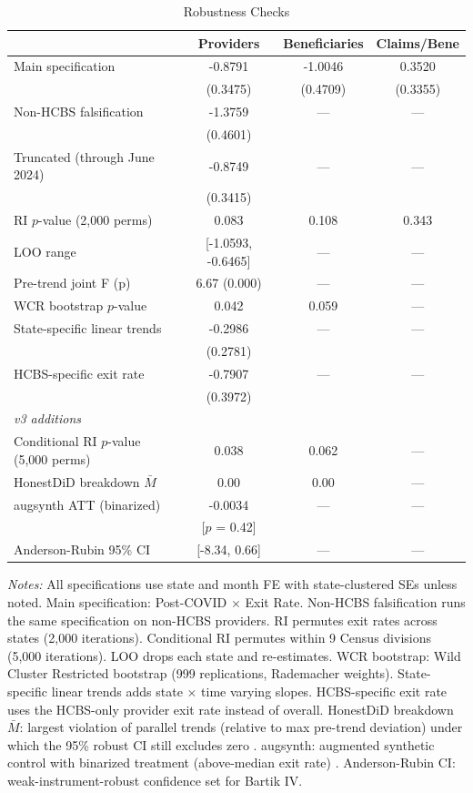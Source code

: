 \begin{table}[t]
\centering
\caption{Robustness Checks}
\label{tab:robustness}
\begin{tabular}{lccc}
\toprule
 & Providers & Beneficiaries & Claims/Bene \\
\midrule
Main specification & -0.8791 & -1.0046 & 0.3520 \\
 & (0.3475) & (0.4709) & (0.3355) \\
Non-HCBS falsification & -1.3759 & --- & --- \\
 & (0.4601) & & \\
Truncated (through June 2024) & -0.8749 & --- & --- \\
 & (0.3415) & & \\
\midrule
RI $p$-value (2,000 perms) & 0.083 & 0.108 & 0.343 \\
LOO range & [-1.0593, -0.6465] & --- & --- \\
Pre-trend joint F (p) & 6.67 (0.000) & --- & --- \\
WCR bootstrap $p$-value & 0.042 & 0.059 & --- \\
State-specific linear trends & -0.2986 & --- & --- \\
 & (0.2781) & & \\
HCBS-specific exit rate & -0.7907 & --- & --- \\
 & (0.3972) & & \\
\midrule
\multicolumn{4}{l}{\textit{v3 additions}} \\
Conditional RI $p$-value (5,000 perms) & 0.038 & 0.062 & --- \\
HonestDiD breakdown $\bar{M}$ & 0.00 & 0.00 & --- \\
augsynth ATT (binarized) & -0.0034 & --- & --- \\
 & [$p$ = 0.42] & & \\
Anderson-Rubin 95\% CI & [-8.34, 0.66] & --- & --- \\
\bottomrule
\end{tabular}
\begin{minipage}{0.9\textwidth}
\vspace{0.2cm}
\footnotesize \textit{Notes:} All specifications use state and month FE with state-clustered SEs unless noted. Main specification: Post-COVID $\times$ Exit Rate. Non-HCBS falsification runs the same specification on non-HCBS providers. RI permutes exit rates across states (2,000 iterations). Conditional RI permutes within 9 Census divisions (5,000 iterations). LOO drops each state and re-estimates. WCR bootstrap: Wild Cluster Restricted bootstrap (999 replications, Rademacher weights). State-specific linear trends adds state $\times$ time varying slopes. HCBS-specific exit rate uses the HCBS-only provider exit rate instead of overall. HonestDiD breakdown $\bar{M}$: largest violation of parallel trends (relative to max pre-trend deviation) under which the 95\% robust CI still excludes zero \citep{rambachan2023}. augsynth: augmented synthetic control with binarized treatment (above-median exit rate) \citep{benmichael2021}. Anderson-Rubin CI: weak-instrument-robust confidence set for Bartik IV.
\end{minipage}
\end{table}
